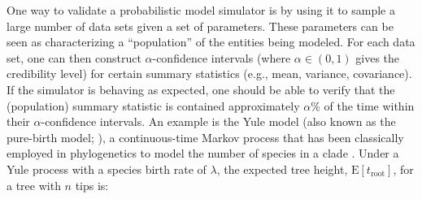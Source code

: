 \documentclass[oneside]{article}
\begin{document}
One way to validate a probabilistic model simulator is by
using it to sample a large number of data sets given a set of parameters.
These parameters can be seen as characterizing a ``population''
of the entities being modeled.
For each data set, one can then construct $\alpha$-confidence intervals
(where $\alpha \in (0,1)$ gives the credibility level) for
certain summary statistics
(e.g., mean, variance, covariance).
If the simulator is behaving as expected, one should
be able to verify that the (population) summary statistic
is contained approximately $\alpha$\% of the time within their
$\alpha$-confidence intervals.
An example is the Yule model (also known as the pure-birth model;
\citealt{yule24}), a continuous-time Markov process that has been
classically employed in phylogenetics to model the number of
species in a clade \citep{yule24,aldous01}.
Under a Yule process with a species birth rate of $\lambda$, the
expected tree height, $\text{E}[t_{\text{root}}]$, for
a tree with $n$ tips is:

\vspace{.5cm}
\end{document}
